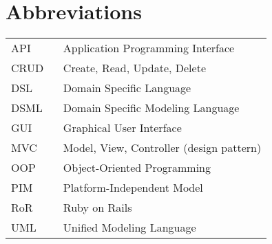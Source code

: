 \chapter*{Abbreviations}

\begin{flushleft}
\begin{tabular}{l p{0.8\linewidth}}
API       & Application Programming Interface\\
CRUD      & Create, Read, Update, Delete\\
DSL       & Domain Specific Language\\
DSML      & Domain Specific Modeling Language\\
GUI       & Graphical User Interface\\
MVC       & Model, View, Controller (design pattern)\\
OOP       & Object-Oriented Programming\\
PIM       & Platform-Independent Model\\
RoR       & Ruby on Rails\\
UML       & Unified Modeling Language\\
\end{tabular}
\end{flushleft}

